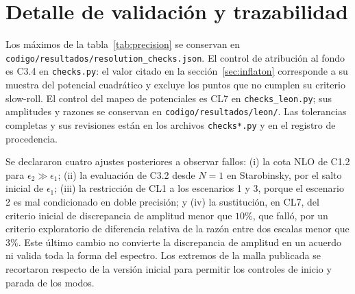 \documentclass[11pt,a4paper]{article}
\numberwithin{equation}{section}
\begin{document}
\appendix
\section{Detalle de validación y trazabilidad}
\label{app:validacion}
Los máximos de la tabla~\ref{tab:precision} se conservan en \texttt{codigo/resultados/resolution\_checks.json}. El control de atribución al fondo es C3.4 en \texttt{checks.py}: el valor citado en la sección~\ref{sec:inflaton} corresponde a su muestra del potencial cuadrático y excluye los puntos que no cumplen su criterio slow-roll. El control del mapeo de potenciales es CL7 en \texttt{checks\_leon.py}; sus amplitudes y razones se conservan en \texttt{codigo/resultados/leon/}. Las tolerancias completas y sus revisiones están en los archivos \texttt{checks*.py} y en el registro de procedencia.

Se declararon cuatro ajustes posteriores a observar fallos: (i) la cota NLO de C1.2 para $\epsilon_2\gg\epsilon_1$; (ii) la evaluación de C3.2 desde $N=1$ en Starobinsky, por el salto inicial de $\epsilon_1$; (iii) la restricción de CL1 a los escenarios 1 y 3, porque el escenario 2 es mal condicionado en doble precisión; y (iv) la sustitución, en CL7, del criterio inicial de discrepancia de amplitud menor que $10\%$, que falló, por un criterio exploratorio de diferencia relativa de la razón entre dos escalas menor que $3\%$. Este último cambio no convierte la discrepancia de amplitud en un acuerdo ni valida toda la forma del espectro. Los extremos de la malla publicada se recortaron respecto de la versión inicial para permitir los controles de inicio y parada de los modos.
\end{document}
